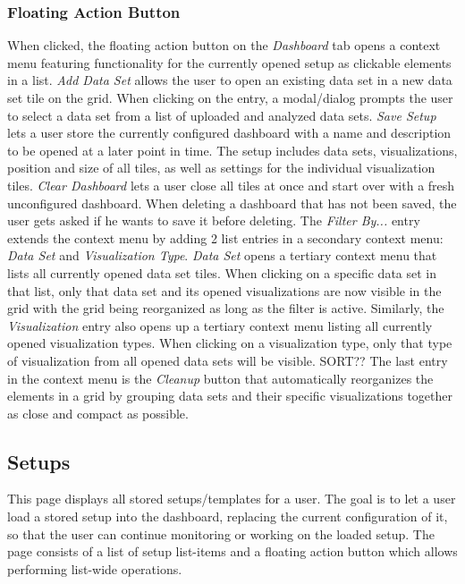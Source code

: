 \subsubsection{Floating Action Button}
\label{dash:fab}
When clicked, the floating action button on the \emph{Dashboard} tab opens a context menu featuring functionality for the currently opened setup as clickable elements in a list. \emph{Add Data Set} allows the user to open an existing data set in a new data set tile on the grid. When clicking on the entry, a modal/dialog prompts the user to select a data set from a list of uploaded and analyzed data sets. \emph{Save Setup} lets a user store the currently configured dashboard with a name and description to be opened at a later point in time. The setup includes data sets, visualizations, position and size of all tiles, as well as settings for the individual visualization tiles. \emph{Clear Dashboard} lets a user close all tiles at once and start over with a fresh unconfigured dashboard. When deleting a dashboard that has not been saved, the user gets asked if he wants to save it before deleting. The \emph{Filter By...} entry extends the context menu by adding 2 list entries in a secondary context menu: \emph{Data Set} and \emph{Visualization Type}. \emph{Data Set} opens a tertiary context menu that lists all currently opened data set tiles. When clicking on a specific data set in that list, only that data set and its opened visualizations are now visible in the grid with the grid being reorganized as long as the filter is active. Similarly, the \emph{Visualization} entry also opens up a tertiary context menu listing all currently opened visualization types. When clicking on a visualization type, only that type of visualization from all opened data sets will be visible. SORT?? The last entry in the context menu is the \emph{Cleanup} button that automatically reorganizes the elements in a grid by grouping data sets and their specific visualizations together as close and compact as possible. 

\subsection{Setups}
\label{setups:main}
This page displays all stored setups/templates for a user. The goal is to let a user load a stored setup into the dashboard, replacing the current configuration of it, so that the user can continue monitoring or working on the loaded setup. The page consists of a list of setup list-items and a floating action button which allows performing list-wide operations.
